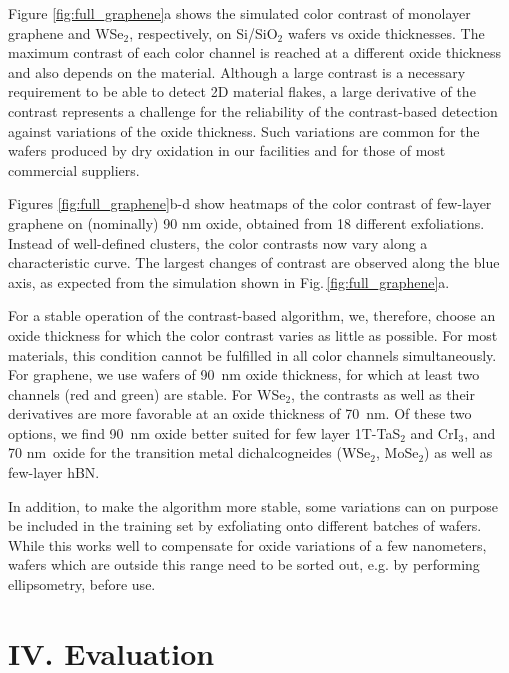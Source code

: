 \documentclass[reprint, prl, superscriptaddress, floatfix]{revtex4-2}
\newcommand{\fig}[1]{Fig.\,\ref{#1}}
\newcommand{\WSe}{WSe$_2$}
\begin{document}
Figure \ref{fig:full_graphene}a shows the simulated color contrast of monolayer graphene and \WSe, respectively, on Si/SiO$_2$ wafers vs oxide thicknesses. 
The maximum contrast of each color channel is reached at a different oxide thickness and also depends on the material. 
Although a large contrast is a necessary requirement to be able to detect 2D material flakes, a large derivative of the contrast represents a challenge for the reliability of the contrast-based detection against variations of the oxide thickness. 
Such variations are common for the wafers produced  by dry oxidation in our facilities and for those of most commercial suppliers. 

Figures \ref{fig:full_graphene}b-d show heatmaps of the color contrast of few-layer graphene on (nominally) 90 nm oxide, obtained from 18 different exfoliations.
Instead of well-defined clusters, the color contrasts now vary along a characteristic curve.
The largest changes of contrast are observed along the blue axis, as expected from the simulation shown in \fig{fig:full_graphene}a. 


For a stable operation of the contrast-based algorithm, we, therefore, choose an oxide thickness for which the color contrast varies as little as possible. 
For most materials, this condition cannot be fulfilled in all color channels simultaneously.
For graphene, we use wafers of 90~nm oxide thickness, for which at least two channels (red and green) are stable. 
For \WSe, the contrasts as well as their derivatives are more favorable at an oxide thickness of 70~nm. 
Of these two options, we find 90~nm oxide better suited for few layer 1T-TaS$_2$ and CrI$_3$, and 70 nm~oxide for the transition metal dichalcogneides (\WSe, MoSe$_2$) as well as few-layer hBN.

In addition, to make the algorithm more stable, some variations can on purpose be included in the training set by exfoliating onto different batches of wafers. 
While this works well to compensate for oxide variations of a few nanometers, wafers which are outside this range need to be sorted out, e.g. by performing ellipsometry, before use.


\section{IV. Evaluation}
\end{document}
